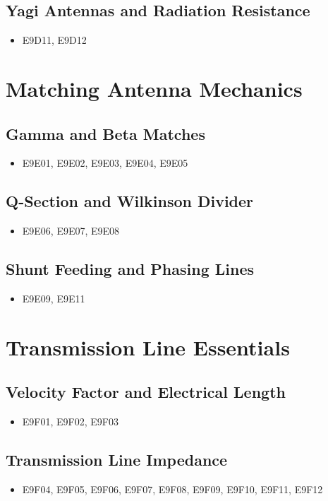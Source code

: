 \documentclass{book}
\begin{document}
\subsection{Yagi Antennas and Radiation Resistance}
\begin{itemize}
    \item E9D11, E9D12
\end{itemize}

\section{Matching Antenna Mechanics}
\subsection{Gamma and Beta Matches}
\begin{itemize}
    \item E9E01, E9E02, E9E03, E9E04, E9E05
\end{itemize}
\subsection{Q-Section and Wilkinson Divider}
\begin{itemize}
    \item E9E06, E9E07, E9E08
\end{itemize}
\subsection{Shunt Feeding and Phasing Lines}
\begin{itemize}
    \item E9E09, E9E11
\end{itemize}

\section{Transmission Line Essentials}
\subsection{Velocity Factor and Electrical Length}
\begin{itemize}
    \item E9F01, E9F02, E9F03
\end{itemize}
\subsection{Transmission Line Impedance}
\begin{itemize}
    \item E9F04, E9F05, E9F06, E9F07, E9F08, E9F09, E9F10, E9F11, E9F12
\end{itemize}
\end{document}
